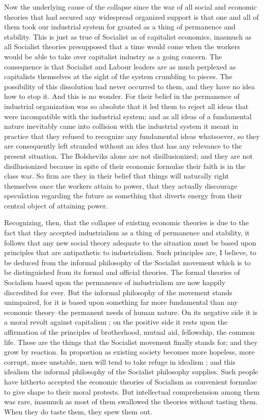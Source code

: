 \documentclass{book}
\begin{document}
Now the underlying cause of the collapse since the war of all social and economic theories that had secured any widespread organized support is that one and all of them took our industrial system for granted as a thing of permanence and stability. This is just as true of Socialist as of capitalist economics, inasmuch as all Socialist theories presupposed that a time would come when the workers would be able to take over capitalist industry as a going concern. The consequence is that Socialist and Labour leaders are as much perplexed as capitalists themselves at the sight of the system crumbling to pieces. The possibility of this dissolution had never occurred to them, and they have no idea how to stop it. And this is no wonder. For their belief in the permanence of industrial organization was so absolute that it led them to reject all ideas that were incompatible with the industrial system; and as all ideas of a fundamental nature inevitably came into collision with the industrial system it meant in practice that they refused to recognize any fundamental ideas whatsoever, so they are consequently left stranded without an idea that has any relevance to the present situation. The Bolsheviks alone are not disillusionized; and they are not disillusionized because in spite of their economic formulae their faith is in the class war. So firm are they in their belief that things will naturally right themselves once the workers attain to power, that they actually discourage speculation regarding the future as something that diverts energy from their central object of attaining power.

Recognizing, then, that the collapse of existing economic theories is due to the fact that they accepted industrialism as a thing of permanence and stability, it follows that any new social theory adequate to the situation must be based upon principles that are antipathetic to industrialism. Such principles are, I believe, to be deduced from the informal philosophy of the Socialist movement which is to be distinguished from its formal and official theories. The formal theories of Socialism based upon the permanence of industrialism are now happily discredited for ever. But the informal philosophy of the movement stands unimpaired, for it is based upon something far more fundamental than any economic theory–the permanent needs of human nature. On its negative side it is a moral revolt against capitalism ; on the positive side it rests upon the affirmation of the principles of brotherhood, mutual aid, fellowship, the common life. These are the things that the Socialist movement finally stands for; and they grow by reaction. In proportion as existing society becomes more hopeless, more corrupt, more unstable, men will tend to take refuge in idealism ; and this idealism the informal philosophy of the Socialist philosophy supplies. Such people have hitherto accepted the economic theories of Socialism as convenient formulae to give shape to their moral protests. But intellectual comprehension among them was rare, inasmuch as most of them swallowed the theories without tasting them. When they do taste them, they spew them out.
\end{document}
